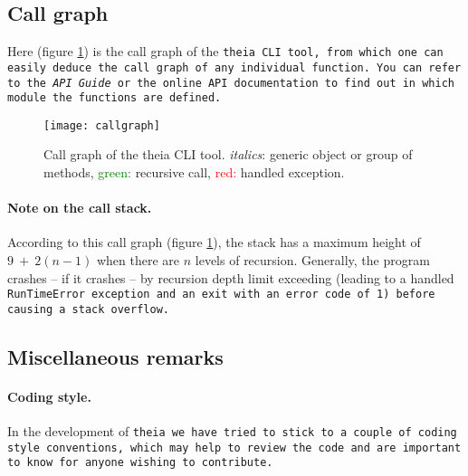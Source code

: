 \documentclass{article}
\begin{document}
\subsection{Call graph}
Here (figure \ref{callgraph}) is the call graph of the \tt{theia} CLI tool, from which one can easily deduce the call graph of any individual function. You can refer to the \textit{API Guide} or the online API documentation to find out in which module the functions are defined.


\begin{figure}[h]
\begin{center}
\texttt{[image: callgraph]}
\end{center}
\caption{Call graph of the theia CLI tool. \textit{italics}: generic object or group of methods, \textcolor{green}{green:} recursive call, \textcolor{red}{red:} handled exception.}
\label{callgraph}
\end{figure}



\paragraph{Note on the  call stack.}According to this call graph (figure \ref{callgraph}), the stack has a maximum height of $9~+~2(n-1)$ when there are $n$ levels of recursion. Generally, the program crashes -- if it crashes -- by recursion depth limit exceeding (leading to a handled \tt{RunTimeError} exception and an exit with an error code of 1) before causing a stack overflow.

\subsection{Miscellaneous remarks}

\paragraph{Coding style.}In the development of \tt{theia} we have tried to stick to a couple of coding style conventions, which may help to review the code and are important to know for anyone wishing to contribute.
\end{document}

